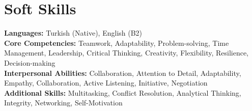 \documentclass[letterpaper,11pt]{article}
\newcommand{\resumeSubHeadingListStart}{\begin{itemize}[leftmargin=0.15in, label={}]}
\newcommand{\resumeSubHeadingListEnd}{\end{itemize}}
\begin{document}
  \section{Soft Skills}
    \vspace{2pt}
    \resumeSubHeadingListStart
      \small{\item{
          \textbf{Languages:}{ Turkish (Native), English (B2)}  \\ \vspace{3pt}
          \textbf{Core Competencies:}{ Teamwork, Adaptability, Problem-solving, Time Management, Leadership, Critical Thinking, Creativity, Flexibility, Resilience, Decision-making}  \\ \vspace{3pt}
          \textbf{Interpersonal Abilities:}{ Collaboration, Attention to Detail, Adaptability, Empathy, Collaboration, Active Listening, Initiative, Negotiation}  \\ \vspace{3pt}
          \textbf{Additional Skills:}{ Multitasking, Conflict Resolution, Analytical Thinking, Integrity, Networking, Self-Motivation}
      }}
    \resumeSubHeadingListEnd
  
\end{document}
